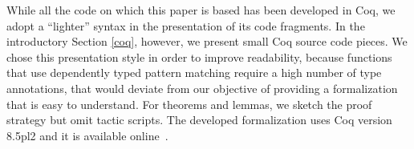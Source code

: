 While all the code on which this paper is based has been developed in
Coq, we adopt a ``lighter'' syntax in the presentation of its code
fragments. In the introductory Section \ref{coq}, however, we present
small Coq source code pieces. We chose this presentation style in
order to improve readability, because functions that use dependently
typed pattern matching require a high number of type annotations, that
would deviate from our objective of providing a formalization that is
easy to understand.
For theorems and lemmas, we sketch the proof strategy but omit tactic
scripts. The developed formalization uses Coq version 8.5pl2 and it is
available online~.

